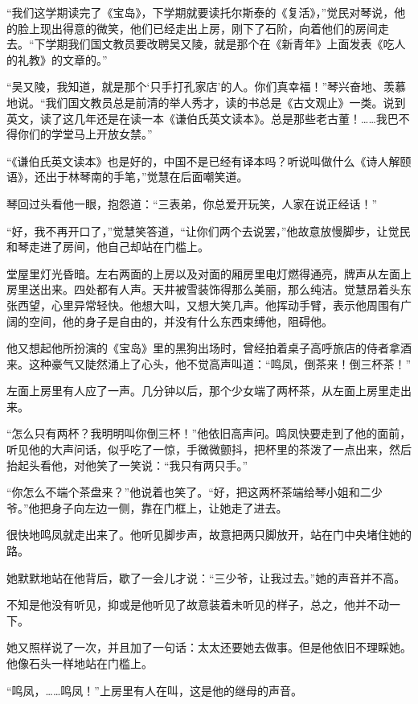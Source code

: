 \par “我们这学期读完了《宝岛》，下学期就要读托尔斯泰的《复活》，”觉民对琴说，他的脸上现出得意的微笑，他们已经走出上房，刚下了石阶，向着他们的房间走去。“下学期我们国文教员要改聘吴又陵，就是那个在《新青年》上面发表《吃人的礼教》的文章的。”
\par “吴又陵，我知道，就是那个‘只手打孔家店’的人。你们真幸福！”琴兴奋地、羡慕地说。“我们国文教员总是前清的举人秀才，读的书总是《古文观止》一类。说到英文，读了这几年还是在读一本《谦伯氏英文读本》。总是那些老古董！……我巴不得你们的学堂马上开放女禁。”
\par “《谦伯氏英文读本》也是好的，中国不是已经有译本吗？听说叫做什么《诗人解颐语》，还出于林琴南的手笔，”觉慧在后面嘲笑道。
\par 琴回过头看他一眼，抱怨道：“三表弟，你总爱开玩笑，人家在说正经话！”
\par “好，我不再开口了，”觉慧笑答道，“让你们两个去说罢，”他故意放慢脚步，让觉民和琴走进了房间，他自己却站在门槛上。
\par 堂屋里灯光昏暗。左右两面的上房以及对面的厢房里电灯燃得通亮，牌声从左面上房里送出来。四处都有人声。天井被雪装饰得那么美丽，那么纯洁。觉慧昂着头东张西望，心里异常轻快。他想大叫，又想大笑几声。他挥动手臂，表示他周围有广阔的空间，他的身子是自由的，并没有什么东西束缚他，阻碍他。
\par 他又想起他所扮演的《宝岛》里的黑狗出场时，曾经拍着桌子高呼旅店的侍者拿酒来。这种豪气又陡然涌上了心头，他不觉高声叫道：“鸣凤，倒茶来！倒三杯茶！”
\par 左面上房里有人应了一声。几分钟以后，那个少女端了两杯茶，从左面上房里走出来。
\par “怎么只有两杯？我明明叫你倒三杯！”他依旧高声问。鸣凤快要走到了他的面前，听见他的大声问话，似乎吃了一惊，手微微颤抖，把杯里的茶泼了一点出来，然后抬起头看他，对他笑了一笑说：“我只有两只手。”
\par “你怎么不端个茶盘来？”他说着也笑了。“好，把这两杯茶端给琴小姐和二少爷。”他把身子向左边一侧，靠在门框上，让她走了进去。
\par 很快地鸣凤就走出来了。他听见脚步声，故意把两只脚放开，站在门中央堵住她的路。
\par 她默默地站在他背后，歇了一会儿才说：“三少爷，让我过去。”她的声音并不高。
\par 不知是他没有听见，抑或是他听见了故意装着未听见的样子，总之，他并不动一下。
\par 她又照样说了一次，并且加了一句话：太太还要她去做事。但是他依旧不理睬她。他像石头一样地站在门槛上。
\par “鸣凤，……鸣凤！”上房里有人在叫，这是他的继母的声音。

